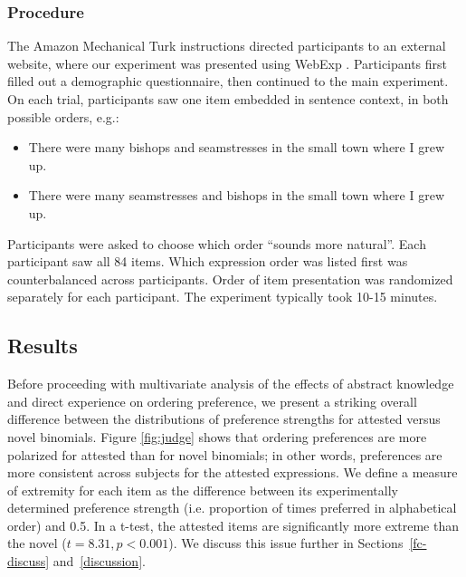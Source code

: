 \documentclass[authoryear]{elsarticle}
\begin{document}
\subsubsection{Procedure}
The Amazon Mechanical Turk instructions directed participants to an external website, where our experiment was presented using WebExp \citep{Keller:2009wn}. Participants first filled out a demographic questionnaire, then continued to the main experiment. On each trial, participants saw one item embedded in sentence context, in both possible orders, e.g.:
\begin{itemize}
\item There were many bishops and seamstresses in the small town where I grew up.
\item There were many seamstresses and bishops in the small town where I grew up.
\end{itemize}
Participants were asked to choose which order ``sounds more natural''. Each participant saw all 84 items. Which expression order was listed first was counterbalanced across participants. Order of item presentation was randomized separately for each participant. The experiment typically took 10-15 minutes.

\subsection{Results}
Before proceeding with multivariate analysis of the effects of abstract knowledge and direct experience on ordering preference, we present a striking overall difference between the distributions of preference strengths for attested versus novel binomials. Figure \ref{fig:judge} shows that ordering preferences are more polarized for attested than for novel binomials; in other words, preferences are more consistent across subjects for the attested expressions. We define a measure of extremity for each item as the difference between its experimentally determined preference strength (i.e. proportion of times preferred in alphabetical order) and 0.5. In a t-test, the attested items are significantly more extreme than the novel ($t=8.31, p < 0.001$). We discuss this issue further in Sections~\ref{fc-discuss} and~\ref{discussion}.
\end{document}
